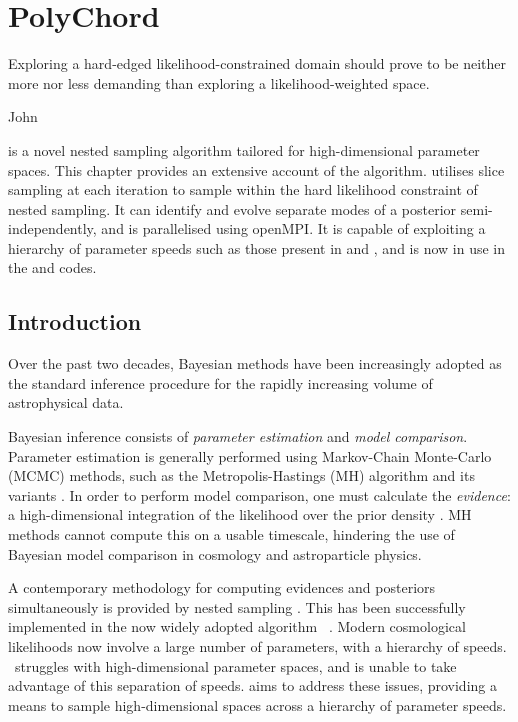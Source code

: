 \chapter{PolyChord}
\label{chp:pc}

\epigraph{Exploring a hard-edged likelihood-constrained domain should prove to be neither more nor less demanding than exploring a likelihood-weighted space.}{John~\cite{skilling2006}}

\noindent 
\PolyChord{} is a novel nested sampling algorithm tailored for high-dimensional parameter spaces. This chapter provides an extensive account of the algorithm. \PolyChord{} utilises slice sampling at each iteration to sample within the hard likelihood constraint of nested sampling. It can identify and evolve separate modes of a posterior semi-independently, and is parallelised using openMPI\@. It is capable of exploiting a hierarchy of parameter speeds such as those present in \CosmoMC{} \citep{cosmomc} and \CAMB{} \citep{CAMB}, and is now in use in the \CosmoChord{} and \ModeChord{} \citep{ModeChord1,ModeChord2,ModeChord3} codes. 

\section{Introduction}

Over the past two decades, Bayesian methods have been increasingly adopted as the standard inference procedure for the rapidly increasing volume of astrophysical data.

Bayesian inference consists of {\em parameter estimation\/} and {\em model comparison}.  Parameter estimation is generally performed using Markov-Chain Monte-Carlo (MCMC) methods, such as the Metropolis-Hastings (MH) algorithm and its variants \citep{MacKay}.  In order to perform model comparison, one must calculate the {\em evidence\/}: a high-dimensional integration of the likelihood over the prior density \citep{Sivia}.  MH methods cannot compute this on a usable timescale, hindering the use of Bayesian model comparison in cosmology and astroparticle physics.

A contemporary methodology for computing evidences and posteriors simultaneously is provided by nested sampling \citep{skilling2006}. This has been successfully implemented in the now widely adopted algorithm \MultiNest\, \citep{MultiNest1,MultiNest2,MultiNest3}.  Modern cosmological likelihoods now involve a large number of parameters, with a hierarchy of speeds.  \MultiNest\ struggles with high-dimensional parameter spaces, and is unable to take advantage of this separation of speeds.  \PolyChord{} aims to address these issues, providing a means to sample high-dimensional spaces across a hierarchy of parameter speeds.

